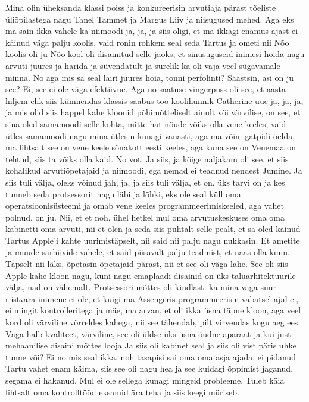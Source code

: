Mina olin üheksanda klassi poiss ja konkureerisin  arvutiaja pärast tõeliste üliõpilastega nagu Tanel Tammet ja Margus Liiv ja niisugused mehed. Aga eks ma sain ikka vahele ka niimoodi ja, ja, ja siis oligi, et ma ikkagi enamus ajast ei käinud väga palju koolis, vaid ronin rohkem seal seda Tartus ja ometi nii Nõo koolis oli ju Nõo kool oli disainitud selle jaoks, et sinusuguseid inimesi hoida nagu arvuti juures ja harida ja süvendatult ja surelik ka oli vaja veel sügavamale minna. No aga mis sa seal lairi juures hoia, tonni perfolinti? Säästsin, asi on ju see? Ei, see ei ole väga efektiivne. Aga no saatuse vingerpuss oli see, et aasta hiljem ehk siis kümnendas klassis saabus too koolihunnik Catherine uue ja, ja, ja, ja mis olid siis happel kahe kloonid põhimõtteliselt ainult või värvilise, on see, et sina oled samamoodi selle kohta, mitte hat nõude võiks olla vene keeles, vaid ütles samamoodi nagu mina ütlesin kunagi vanasti, aga ma võin igatpidi öelda, ma lihtsalt see on vene keele sõnakott eesti keeles, aga kuna see on Venemaa on tehtud, siis ta võiks olla kaid. No vot. Ja siis, ja kõige naljakam oli see, et siis kohalikud arvutiõpetajaid ja niimoodi, ega nemad ei teadnud nendest Jumine. Ja siis tuli välja, oleks võinud jah, ja, ja siis tuli välja, et on, üks tarvi on ja kes tunneb seda protsessorit nagu läbi ja lõhki, eks ole seal küll oma operatsioonisüsteemi ja omab vene keeles programmeerimiskeeled, aga vahet polnud, on ju. Nii, et et noh, ühel hetkel mul oma arvutuskeskuses oma oma kabinetti oma arvuti, nii et olen ja seda siis puhtalt selle pealt, et sa oled käinud Tartus Apple'i kahte uurimistäpselt, nii said nii palju nagu nukkasin. Et ametite ja muude sarhiivide vahele, et said piisavalt palju teadmist, et naas olla kunn. Täpselt nii läks, õpetasin õpetajaid pärast, nii et see oli väga lahe. See oli siis Apple kahe kloon nagu, kuni nagu emaplaadi disainid on üks taluarhitektuurile välja, nad on vähemalt. Protsessori mõttes oli kindlasti ka mina väga suur riistvara inimene ei ole, et kuigi ma Assengeris programmeerisin vabatsel ajal ei, ei mingit kontrolleritega ja mäe, ma arvan, et oli ikka üsna täpne kloon, aga veel kord oli värviline võrreldes kahega, nii see tähendab, pilt virvendas kogu aeg ees. Väga halb kvaliteet, värviline, see oli üldse üks üsna õudne aparaat ja kui just mehaanilise disaini mõttes looja
Ja siis oli kabinet seal ja siis oli vist päris uhke tunne või? Ei no mis seal ikka, noh tasapisi sai oma oma asja ajada, ei pidanud Tartu vahet enam käima, siis see oli nagu hea ja see kuidagi õppimist jaganud, segama ei hakanud. Mul ei ole sellega kunagi mingeid probleeme. Tuleb käia lihtsalt oma kontrolltööd eksamid ära teha ja siis keegi müriseb.
